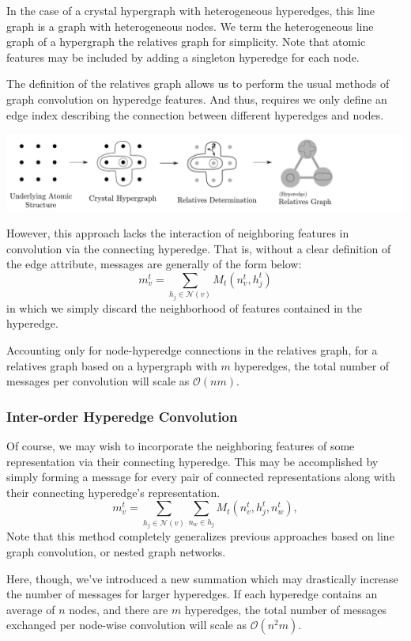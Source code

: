 \documentclass[10pt,a4paper]{article}
\begin{document}
In the case of a crystal hypergraph with heterogeneous hyperedges, this line graph is a graph with heterogeneous nodes. We term the heterogeneous line graph of a hypergraph the relatives graph for simplicity. 
Note that atomic features may be included by adding a singleton hyperedge for each node.

The definition of the relatives graph allows us to perform the usual methods of graph convolution on hyperedge features. And thus, requires we only define an edge index describing the connection between different hyperedges and nodes.

\begin{center}
\includegraphics[scale=0.42]{relgraph_workflow_horiz.pdf}
\end{center}
However, this approach lacks the interaction of neighboring features in convolution via the connecting hyperedge. That is, without a clear definition of the edge attribute, messages are generally of the form below:
$$
m_v^{t} = \sum_{h_j\in \mathcal{N}(v)}M_t(n_v^{t},h_j^{t})
$$
in which we simply discard the neighborhood of features contained in the hyperedge.

Accounting only for node-hyperedge connections in the relatives graph, for a relatives graph based on a hypergraph with $m$ hyperedges, the total number of messages per convolution will scale as $\mathcal{O}(nm)$.
 
\subsubsection{Inter-order Hyperedge Convolution}
Of course, we may wish to incorporate the neighboring features of some representation via their connecting hyperedge. This may be accomplished by simply forming a message for every pair of connected representations along with their connecting hyperedge's representation.
$$
m_v^{t} = \sum_{h_j\in \mathcal{N}(v)} \sum_{n_w \in h_j } M_t(n_v^{t},h_j^{t}, n_w^t),
$$
Note that this method completely generalizes previous approaches based on line graph convolution, or nested graph networks.

Here, though, we've introduced a new summation which may drastically increase the number of messages for larger hyperedges. If each hyperedge contains an average of $n$ nodes, and there are $m$ hyperedges, the total number of messages exchanged per node-wise convolution will scale as $\mathcal{O}(n^2m)$.
\end{document}
